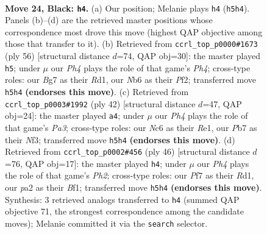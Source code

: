 \documentclass[11pt]{article}
\begin{document}
\clearpage

\begin{figure}[p]\centering
\begin{subfigure}{0.46\textwidth}\centering
\resizebox{\linewidth}{!}{%
\newchessgame
\chessboard[
  setfen={2r3k1/pp3pb1/1nn2qp1/3p3p/3P4/1B4BP/PP3PP1/RN2Q1K1 b - - 2 24},
  showmover=false,
  pgfstyle=straightmove, color=movearrow, markmove={h5-h4}
]}
\caption{}
\end{subfigure}\hfill
\begin{subfigure}{0.46\textwidth}\centering
\resizebox{\linewidth}{!}{%
\newchessgame
\chessboard[
  setfen={4r2k/2pq1pp1/2nb2bp/1p6/3P3P/1B3NN1/1P3PP1/2QR2K1 w - - 5 29},
  showmover=false,
  pgfstyle=straightmove, color=movearrow, markmove={h4-h5}
]}
\caption{}
\end{subfigure}
\\[4pt]
\begin{subfigure}{0.46\textwidth}\centering
\resizebox{\linewidth}{!}{%
\newchessgame
\chessboard[
  setfen={rb1q1nk1/1b4p1/p3p2p/1p6/2p1N3/P3PN1P/1PQ2PP1/1B2R1K1 w - - 0 22},
  showmover=false,
  pgfstyle=straightmove, color=movearrow, markmove={a3-a4}
]}
\caption{}
\end{subfigure}\hfill
\begin{subfigure}{0.46\textwidth}\centering
\resizebox{\linewidth}{!}{%
\newchessgame
\chessboard[
  setfen={3rq1k1/p1p2p2/1p3bpp/1P1b4/3N4/2P3P1/P1Q2P1P/3R1BK1 w - - 0 24},
  showmover=false,
  pgfstyle=straightmove, color=movearrow, markmove={h2-h4}
]}
\caption{}
\end{subfigure}
\caption{\textbf{Move 24, Black: \texttt{h4}.} (a) Our position; Melanie plays \texttt{h4} (\texttt{h5h4}). Panels (b)--(d) are the retrieved master positions whose correspondence most drove this move (highest QAP objective among those that transfer to it). (b) Retrieved from \texttt{ccrl\_top\_p0000\#1673} (ply 56) [structural distance $d$=74, QAP obj=30]: the master played \texttt{h5}; under $\mu$ our \emph{Ph4} plays the role of that game's \emph{Ph4}; cross-type roles: our \emph{B}g7 as their \emph{R}d1, our \emph{N}b6 as their \emph{P}f2; transferred move \texttt{h5h4} \textbf{(endorses this move)}. (c) Retrieved from \texttt{ccrl\_top\_p0003\#1992} (ply 42) [structural distance $d$=47, QAP obj=24]: the master played \texttt{a4}; under $\mu$ our \emph{Ph4} plays the role of that game's \emph{Pa3}; cross-type roles: our \emph{N}c6 as their \emph{R}e1, our \emph{P}b7 as their \emph{N}f3; transferred move \texttt{h5h4} \textbf{(endorses this move)}. (d) Retrieved from \texttt{ccrl\_top\_p0002\#456} (ply 46) [structural distance $d$=76, QAP obj=17]: the master played \texttt{h4}; under $\mu$ our \emph{Ph4} plays the role of that game's \emph{Ph2}; cross-type roles: our \emph{P}f7 as their \emph{R}d1, our \emph{p}a2 as their \emph{B}f1; transferred move \texttt{h5h4} \textbf{(endorses this move)}. Synthesis: 3 retrieved analogs transferred to \texttt{h4} (summed QAP objective 71, the strongest correspondence among the candidate moves); Melanie committed it via the \texttt{search} selector.}
\label{fig:thought-m47}
\end{figure}
\end{document}
